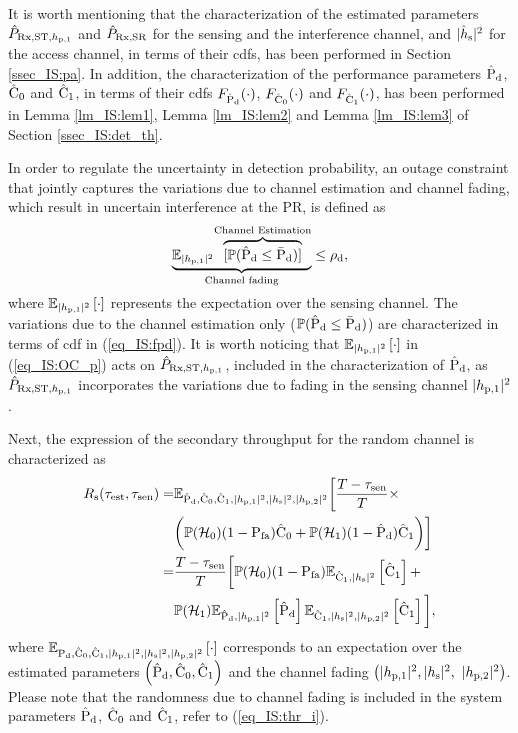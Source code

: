 It is worth mentioning that the characterization of the estimated parameters $\eprcvdstpt$ and $\eprcvdsr$ for the sensing and the interference channel, and $\ephs$ for the access channel, in terms of their cdfs, has been performed in Section \ref{ssec_IS:pa}. In addition, the characterization of the performance parameters $\epd$, $\ecz$ and $\eco$, in terms of their cdfs $\fpd(\cdot)$, $\fcz(\cdot)$ and $\fco(\cdot)$, has been performed in Lemma \ref{lm_IS:lem1}, Lemma \ref{lm_IS:lem2} and Lemma \ref{lm_IS:lem3} of Section \ref{ssec_IS:det_th}.

In order to regulate the uncertainty in detection probability, an outage constraint that jointly captures the variations due to channel estimation and channel fading, which result in uncertain interference at the PR, is defined as 
\begin{align}
\smash[b]{\underbrace{\mathbb{E}_{\phpo}{\smash[b]{\overbrace{[\p( \epd \le \pdd)]}^{\text{Channel Estimation}}}}}_{\text{Channel fading}}} &\le \mpd, \label{eq_IS:OC_p} \\[-0.1em] \nonumber 
\end{align}
where $\e{\phpo}{\cdot}$ represents the expectation over the sensing channel. The variations due to the channel estimation only ($\p(\epd \le \pdd)$) are characterized in terms of cdf in (\ref{eq_IS:fpd}).
It is worth noticing that $\e{\phpo}{\cdot}$ in (\ref{eq_IS:OC_p}) acts on $\eprcvdstpt$, included in the characterization of $\epd$, as $\eprcvdstpt$ incorporates the variations due to fading in the sensing channel $\phpo$.

Next, the expression of the secondary throughput for the random channel is characterized as 
\begin{align}
\rs(\test, \tsen) =& \mathbb{E}_{\epd,\ecz,\eco,\phpo, \phs, \phpt} \bigg[ \frac{T - \tsen}{T} \times \nonumber \\ & \bigg( \phz (1 - \pfa) \ecz + \pho (1 -\epd) \eco \bigg) \bigg] \label{eq_IS:thr_p} \\
  \quad =& \frac{T - \tsen}{T} \bigg[ \phz (1 - \pfa) \e{\eco, \phs}{\eco} + \nonumber \\ & \pho \e{\epd, \phpo}{\epd} \e{\eco, \phs, \phpt}{\eco} \bigg], \nonumber 
\end{align}
where $\e{\pd,\ecz,\eco,\phpo, \phs, \phpt}{\cdot}$ corresponds to an expectation over the estimated parameters $\left( \epd, \ecz, \eco \right)$ and the channel fading $\big(\phpo, \phs,$ $\phpt \big)$. Please note that the randomness due to channel fading is included in the system parameters $\epd$, $\ecz$ and $\eco$, refer to (\ref{eq_IS:thr_i}).

